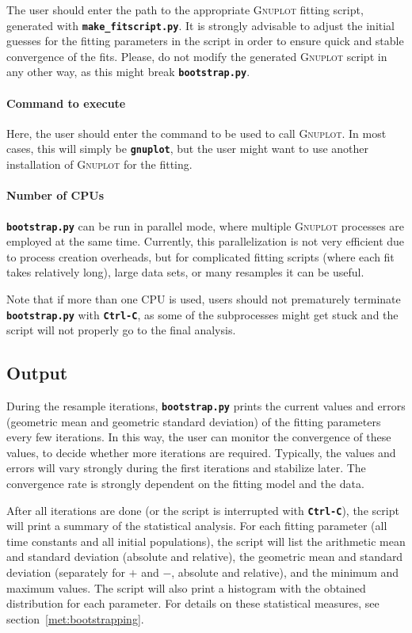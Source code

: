\documentclass[a4paper,10pt,DIV=15,openany]{scrbook}
\newcommand{\ttt}[1]{\textbf{\texttt{#1}}}
\begin{document}
The user should enter the path to the appropriate \textsc{Gnuplot} fitting script, generated with \ttt{make\_fitscript.py}.
It is strongly advisable to adjust the initial guesses for the fitting parameters in the script in order to ensure quick and stable convergence of the fits.
Please, do not modify the generated \textsc{Gnuplot} script in any other way, as this might break \ttt{bootstrap.py}.

\paragraph{Command to execute}

Here, the user should enter the command to be used to call \textsc{Gnuplot}. In most cases, this will simply be \ttt{gnuplot}, but the user might want to use another installation of \textsc{Gnuplot} for the fitting.

\paragraph{Number of CPUs}

\ttt{bootstrap.py} can be run in parallel mode, where multiple \textsc{Gnuplot} processes are employed at the same time.
Currently, this parallelization is not very efficient due to process creation overheads, but for complicated fitting scripts (where each fit takes relatively long), large data sets, or many resamples it can be useful.

Note that if more than one CPU is used, users should not prematurely terminate \ttt{bootstrap.py} with \ttt{Ctrl-C}, as some of the subprocesses might get stuck and the script will not properly go to the final analysis.

\subsection{Output}

During the resample iterations, \ttt{bootstrap.py} prints the current values and errors (geometric mean and geometric standard deviation) of the fitting parameters every few iterations.
In this way, the user can monitor the convergence of these values, to decide whether more iterations are required.
Typically, the values and errors will vary strongly during the first iterations and stabilize later.
The convergence rate is strongly dependent on the fitting model and the data.

After all iterations are done (or the script is interrupted with \ttt{Ctrl-C}), the script will print a summary of the statistical analysis.
For each fitting parameter (all time constants and all initial populations), the script will list the arithmetic mean and standard deviation (absolute and relative), the geometric mean and standard deviation (separately for $+$ and $-$, absolute and relative), and the minimum and maximum values.
The script will also print a histogram with the obtained distribution for each parameter.
For details on these statistical measures, see section~\ref{met:bootstrapping}.
\end{document}
